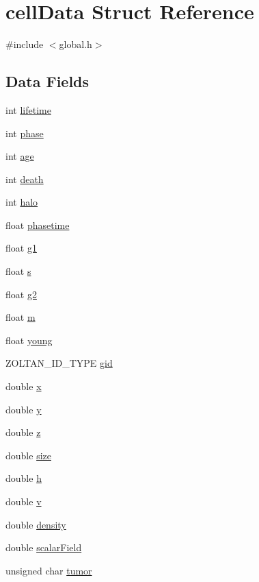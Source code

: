 \hypertarget{structcellData}{\section{cell\-Data Struct Reference}
\label{structcellData}
}


{\ttfamily \#include $<$global.\-h$>$}

\subsection*{Data Fields}
\begin{DoxyCompactItemize}
\item 
int \hyperlink{structcellData_ada4af333b662b0bba80e2f5e273fe4ea}{lifetime}
\item 
int \hyperlink{structcellData_accf3aec63bc20b3c99ab4881cb07c05b}{phase}
\item 
int \hyperlink{structcellData_a91d98a856bbd96810b40af3ca5cc901a}{age}
\item 
int \hyperlink{structcellData_add1e1533be6e693ffedcdbafdf8b855c}{death}
\item 
int \hyperlink{structcellData_a80ff3fcc4d03d0b1b01559839d12df5b}{halo}
\item 
float \hyperlink{structcellData_afe1297f954440c453b59fcb06992dbd5}{phasetime}
\item 
float \hyperlink{structcellData_a581debe7d16bce9d187b97855f4e99d4}{g1}
\item 
float \hyperlink{structcellData_a874f74a4dc1c9a0cd9c6e0d79c298f55}{s}
\item 
float \hyperlink{structcellData_aee9971139118d56815564304450c4775}{g2}
\item 
float \hyperlink{structcellData_ac51334f57ef8b81c0629c9421798c344}{m}
\item 
float \hyperlink{structcellData_ad0bd87a264e65d1c17ecc07049819f2c}{young}
\item 
Z\-O\-L\-T\-A\-N\-\_\-\-I\-D\-\_\-\-T\-Y\-P\-E \hyperlink{structcellData_abb4d4bd9231e9f994e87f32cc4fcfce8}{gid}
\item 
double \hyperlink{structcellData_af88b946fb90d5f08b5fb740c70e98c10}{x}
\item 
double \hyperlink{structcellData_ab927965981178aa1fba979a37168db2a}{y}
\item 
double \hyperlink{structcellData_ab3e6ed577a7c669c19de1f9c1b46c872}{z}
\item 
double \hyperlink{structcellData_aba3c5d750d5dbd6e86c11ecaca62885e}{size}
\item 
double \hyperlink{structcellData_a8ee9be1b5aa75abae556de3088cba6d9}{h}
\item 
double \hyperlink{structcellData_a3b90d5a73541ab9402511d87bed076ef}{v}
\item 
double \hyperlink{structcellData_a6f8c052f8417728038991f7f2826d38d}{density}
\item 
double \hyperlink{structcellData_a0045a5036d7f3f873fe33380932d4313}{scalar\-Field}
\item 
unsigned char \hyperlink{structcellData_a49af8c5336d6c2401bc24f86dbb97b36}{tumor}
\end{DoxyCompactItemize}


